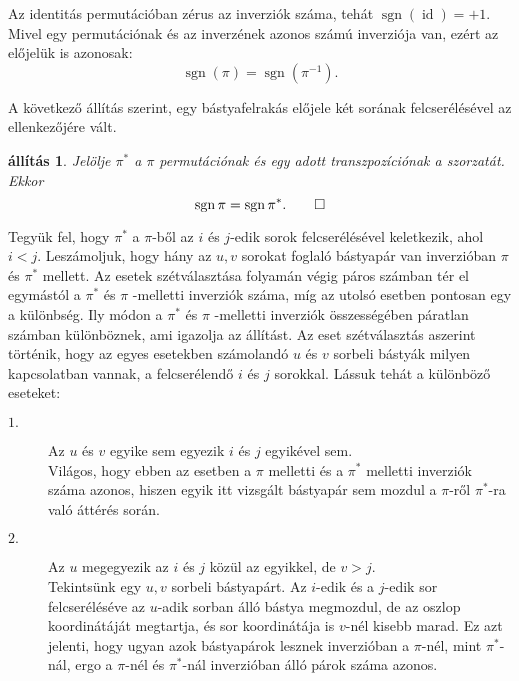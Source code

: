 \documentclass[9pt, a4paper, showtrims]{memoir}
\makeatletter
\renewenvironment{proof}[1][\proofname]
    {\par\pushQED{\qed}%
    \normalfont \topsep6\p@\@plus6\p@\relax
    \trivlist
    \item[\hskip\labelsep
        \itshape
    #1\@addpunct{:}]\ignorespaces}
    {\popQED\endtrivlist\@endpefalse}
\theoremstyle{plain}
\newtheorem{proposition}{állítás}[chapter]
\theoremstyle{remark}
\theoremstyle{definition}
\DeclareMathOperator{\sgn}{sgn}
\DeclareMathOperator{\id}{id}
\makeatother
\begin{document}
Az identitás permutációban zérus az inverziók száma, 
tehát $\sgn(\id)=+1$.
Mivel egy permutációnak és az inverzének azonos számú inverziója van, 
ezért az előjelük is azonosak:
\[
    \sgn\left( \pi \right)=\sgn\left( \pi^{-1} \right).
\]

A következő állítás szerint, 
egy bástyafelrakás előjele két sorának felcserélésével az ellenkezőjére vált.
\begin{proposition}
    Jelölje $\pi^\ast$ a $\pi$ permutációnak és egy adott transzpozíciónak a szorzatát.
    Ekkor 
    \[\sgn \pi=\sgn\pi^\ast.\qedhere
    \]
\end{proposition}
\begin{proof}
    Tegyük fel, 
    hogy $\pi^\ast$ a $\pi$-ből az $i$ és $j$-edik sorok felcserélésével keletkezik, 
    ahol  $i<j$.
    Leszámoljuk, 
    hogy hány az $u,v$ sorokat foglaló bástyapár van inverzióban $\pi$ és $\pi^\ast$ mellett.
    Az esetek szétválasztása folyamán végig páros számban tér el egymástól  a $\pi ^{\ast }$ és $\pi $ -melletti
    inverziók száma, 
    míg az utolsó esetben pontosan egy a különbség. 
    Ily módon a $\pi ^{\ast }$ és $\pi$ -melletti inverziók összességében páratlan számban különböznek,
    ami igazolja az állítást. 
    Az eset szétválasztás aszerint történik, hogy az egyes esetekben számolandó $u$ és $v$ sorbeli bástyák
    milyen kapcsolatban vannak, 
    a felcserélendő $i$ és $j$ sorokkal.
    Lássuk tehát a különböző eseteket:

    \begin{description}
    \item[$1.$]  Az $u$ és $v$ egyike sem egyezik $i$ és $j$ egyikével sem.\\
        Világos, hogy ebben az esetben a $\pi $ melletti és a $\pi ^{\ast }$ melletti
        inverziók száma azonos, hiszen egyik itt vizsgált bástyapár sem mozdul a $\pi$-ről $\pi^\ast$-ra
        való áttérés során.

    \item[$2.$]  Az $u$ megegyezik az $i$ és $j$ közül az egyikkel, de $v>j.$\\
        Tekintsünk egy $u,v$ sorbeli bástyapárt.
        Az $i$-edik és a $j$-edik sor felcseréléséve az $u$-adik sorban álló bástya megmozdul, 
        de az oszlop koordinátáját megtartja, és sor koordinátája is $v$-nél kisebb marad.
        Ez azt jelenti, 
        hogy ugyan azok bástyapárok lesznek inverzióban a $\pi$-nél, mint $\pi^\ast$-nál, ergo a 
        $\pi$-nél és $\pi^\ast$-nál inverzióban álló párok száma azonos.


\end{description}
\end{proof}
\end{document}
